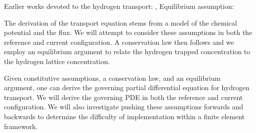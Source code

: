\documentclass[10pt]{elsarticle}
\begin{document}
Earlier works devoted to the hydrogen transport:  \cite{Sofronis1989}, \cite{Krom1998}
Equilibrium assumption: \cite{Oriani1970}

The derivation of the transport equation stems from a model of the chemical potential and the flux. We will attempt to consider these assumptions in both the reference and current configuration. A conservation law then follows and we employ an equilibrium argument to relate the hydrogen trapped concentration to the hydrogen lattice concentration.

Given constitutive assumptions, a conservation law, and an equilibrium argument, one can derive the governing partial differential equation for hydrogen transport. We will derive the governing PDE in both the reference and current configuration. We will also investigate pushing these assumptions forwards and backwards to determine the difficulty of implementation within a finite element framework.
\end{document}
